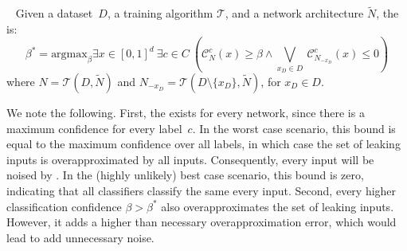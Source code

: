 
\begin{definition}~\label{def:main_problem}
Given a dataset~$D$, a training algorithm $\mathcal{T}$, and a network architecture $\widetilde{N}$, %
the \emph{\propa} is: %
$$%
\beta^*=\text{argmax}_\beta \exists x \in [0,1]^d\ \exists c\in C \ %
\left( 
\mathcal{C}_{N}^c(x) \geq \beta \land \bigvee_{ x_D \in D}\ \mathcal{C}_{N_{-x_D}}^c(x) \leq 0\right )
$$
where $N=\mathcal{T}(D,\widetilde{N})$ and $N_{-x_D}=\mathcal{T}(D\setminus \{x_D\},\widetilde{N})$, for $x_D\in D$.
\end{definition}

We note the following.
First, the \propa exists for every network, since there is a maximum confidence for every label~$c$. In the worst case scenario, this bound is equal to the maximum confidence over all labels, in which case the set of leaking inputs is overapproximated by all inputs. Consequently, every input will be noised by \tool.
In the (highly unlikely) best case scenario, this bound is zero, indicating that all classifiers classify the same every input. %
Second, every higher classification confidence $\beta>\beta^*$ also overapproximates the set of leaking inputs. However, it adds a higher than necessary overapproximation error, which would lead \tool to add unnecessary noise.

